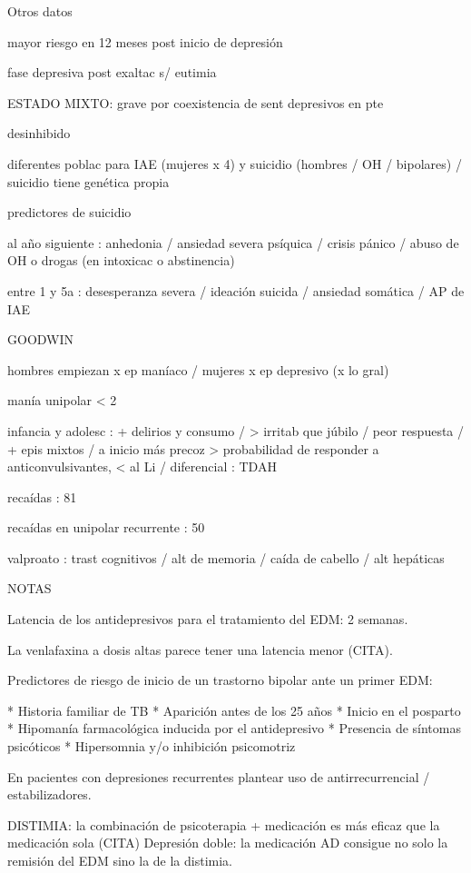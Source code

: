 Otros datos

mayor riesgo en 12 meses post inicio de depresión

fase depresiva post exaltac s/ eutimia

ESTADO MIXTO: grave por coexistencia de sent depresivos en pte

desinhibido

diferentes poblac para IAE (mujeres x 4) y suicidio (hombres / OH / bipolares) / suicidio tiene genética propia

predictores de suicidio

al año siguiente : anhedonia / ansiedad severa psíquica / crisis pánico / abuso de OH o drogas (en intoxicac o abstinencia)

entre 1 y 5a : desesperanza severa / ideación suicida / ansiedad somática / AP de IAE

GOODWIN

hombres empiezan x ep maníaco / mujeres x ep depresivo (x lo gral)

manía unipolar < 2%

infancia y adolesc : + delirios y consumo / > irritab que júbilo / peor respuesta / + epis mixtos / a inicio más precoz > probabilidad de responder a anticonvulsivantes, < al Li / diferencial : TDAH

recaídas : 81%

recaídas en unipolar recurrente : 50%

valproato : trast cognitivos / alt de memoria / caída de cabello / alt hepáticas

NOTAS

Latencia de los antidepresivos para el tratamiento del EDM: 2 semanas.

La venlafaxina a dosis altas parece tener una latencia menor (CITA).

Predictores de riesgo de inicio de un trastorno bipolar ante un primer EDM:

* Historia familiar de TB
* Aparición antes de los 25 años
* Inicio en el posparto
* Hipomanía farmacológica inducida por el antidepresivo
* Presencia de síntomas psicóticos
* Hipersomnia y/o inhibición psicomotriz

En pacientes con depresiones recurrentes plantear uso de antirrecurrencial / estabilizadores.

DISTIMIA: la combinación de psicoterapia + medicación es más eficaz que la medicación sola (CITA)
Depresión doble: la medicación AD consigue no solo la remisión del EDM sino la de la distimia.
